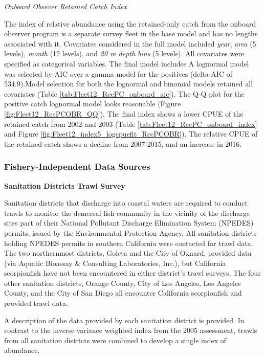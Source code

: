 \documentclass[12pt,]{article}
\begin{document}
\emph{Onboard Obsever Retained Catch Index}

The index of relative abundance using the retained-only catch from the
onboard observer program is a separate survey fleet in the base model
and has no lengths associated with it. Covariates considered in the full
model included \emph{year}, \emph{area} (5 levels), \emph{month} (12
levels), and \emph{20 m depth bins} (5 levels). All covariates were
specified as categorical variables. The final model includes A lognormal
model was selected by AIC over a gamma model for the positives
(delta-AIC of 534.9).Model selection for both the lognormal and binomial
models retained all covariates (Table
\ref{tab:Fleet12_RecPC_onboard_aic}). The Q-Q plot for the positive
catch lognormal model looks reasonable (Figure
\ref{fig:Fleet12_RecPCOBR_QQ}). The final index shows a lower CPUE of
the retained catch from 2002 and 2003 (Table
\ref{tab:Fleet12_RecPC_onboard_index} and Figure
\ref{fig:Fleet12_index5_logcpuefit_RecPCOBR}). The relative CPUE of the
retained catch shows a decline from 2007-2015, and an increase in 2016.

\subsubsection{Fishery-Independent Data
Sources}\label{fishery-independent-data-sources}

\textbf{Sanitation Districts Trawl Survey}

Sanitation districts that discharge into coastal waters are required to
conduct trawls to monitor the demersal fish community in the vicinity of
the discharge sites part of their National Pollutant Discharge
Elimination System (NPEDES) permits, issued by the Environmental
Protection Agency. All sanitation districts holding NPEDES permits in
southern California were contacted for trawl data. The two northernmost
districts, Goleta and the City of Oxnard, provided data (via Aquatic
Bioassay \& Consulting Laboratories, Inc.), but California scorpionfish
have not been encountered in either district's trawl surveys. The four
other sanitation districts, Orange County, City of Los Angeles, Los
Angeles County, and the City of San Diego all encounter California
scorpionfish and provided trawl data.

A description of the data provided by each sanitation district is
provided. In contrast to the inverse variance weighted index from the
2005 assessment, trawls from all sanitation districts were combined to
develop a single index of abundance.
\end{document}

